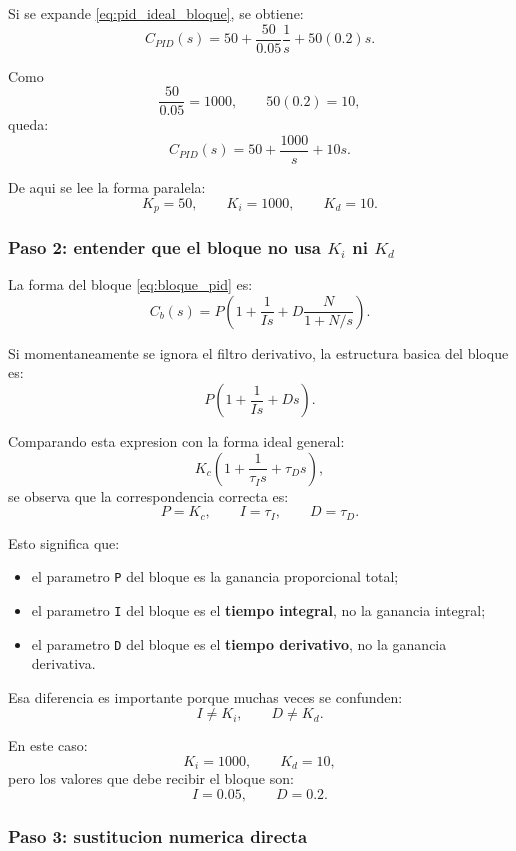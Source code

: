 \documentclass[11pt]{article}
\begin{document}
Si se expande \eqref{eq:pid_ideal_bloque}, se obtiene:
\begin{equation}
C_{PID}(s)=50+\frac{50}{0.05}\frac{1}{s}+50(0.2)s.
\end{equation}

Como
\[
\frac{50}{0.05}=1000,\qquad 50(0.2)=10,
\]
queda:
\begin{equation}
C_{PID}(s)=50+\frac{1000}{s}+10s.
\label{eq:pid_paralela}
\end{equation}

De aqui se lee la forma paralela:
\[
K_p=50,\qquad K_i=1000,\qquad K_d=10.
\]

\subsubsection{Paso 2: entender que el bloque no usa $K_i$ ni $K_d$}

La forma del bloque \eqref{eq:bloque_pid} es:
\[
C_b(s)=P\left(1+\frac{1}{Is}+D\frac{N}{1+N/s}\right).
\]

Si momentaneamente se ignora el filtro derivativo, la estructura basica del bloque es:
\[
P\left(1+\frac{1}{Is}+Ds\right).
\]

Comparando esta expresion con la forma ideal general:
\[
K_c\left(1+\frac{1}{\tau_I s}+\tau_D s\right),
\]
se observa que la correspondencia correcta es:
\begin{equation}
P=K_c,
\qquad
I=\tau_I,
\qquad
D=\tau_D.
\label{eq:equiv_ideal_bloque}
\end{equation}

Esto significa que:

\begin{itemize}[leftmargin=1.2cm]
\item el parametro \texttt{P} del bloque es la ganancia proporcional total;
\item el parametro \texttt{I} del bloque es el \textbf{tiempo integral}, no la ganancia integral;
\item el parametro \texttt{D} del bloque es el \textbf{tiempo derivativo}, no la ganancia derivativa.
\end{itemize}

Esa diferencia es importante porque muchas veces se confunden:
\[
I \neq K_i,
\qquad
D \neq K_d.
\]

En este caso:
\[
K_i=1000,\qquad K_d=10,
\]
pero los valores que debe recibir el bloque son:
\[
I=0.05,\qquad D=0.2.
\]

\subsubsection{Paso 3: sustitucion numerica directa}
\end{document}
